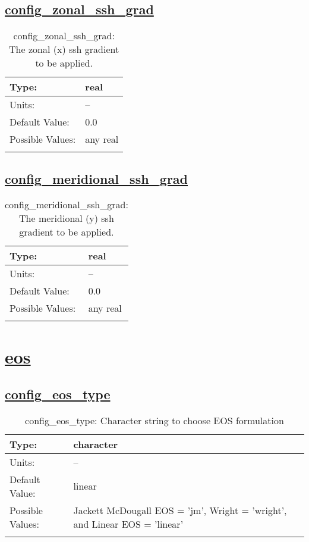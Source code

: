 \subsection[config\_zonal\_ssh\_grad]{\hyperref[sec:nm_tab_pressure_gradient]{config\_zonal\_ssh\_grad}}
\label{subsec:nm_sec_config_zonal_ssh_grad}
\begin{center}
\begin{longtable}{| p{2.0in} || p{4.0in} |}
    \hline
    Type: & real \\
    \hline
    Units: & -- \\
    \hline
    Default Value: & 0.0 \\
    \hline
    Possible Values: & any real \\
    \hline
    \caption{config\_zonal\_ssh\_grad: The zonal (x) ssh gradient to be applied.}
\end{longtable}
\end{center}
\subsection[config\_meridional\_ssh\_grad]{\hyperref[sec:nm_tab_pressure_gradient]{config\_meridional\_ssh\_grad}}
\label{subsec:nm_sec_config_meridional_ssh_grad}
\begin{center}
\begin{longtable}{| p{2.0in} || p{4.0in} |}
    \hline
    Type: & real \\
    \hline
    Units: & -- \\
    \hline
    Default Value: & 0.0 \\
    \hline
    Possible Values: & any real \\
    \hline
    \caption{config\_meridional\_ssh\_grad: The meridional (y) ssh gradient to be applied.}
\end{longtable}
\end{center}
\section[eos]{\hyperref[sec:nm_tab_eos]{eos}}
\label{sec:nm_sec_eos}
\subsection[config\_eos\_type]{\hyperref[sec:nm_tab_eos]{config\_eos\_type}}
\label{subsec:nm_sec_config_eos_type}
\begin{center}
\begin{longtable}{| p{2.0in} || p{4.0in} |}
    \hline
    Type: & character \\
    \hline
    Units: & -- \\
    \hline
    Default Value: & linear \\
    \hline
    Possible Values: & Jackett McDougall EOS = 'jm', Wright = 'wright', and Linear EOS = 'linear' \\
    \hline
    \caption{config\_eos\_type: Character string to choose EOS formulation}
\end{longtable}
\end{center}
